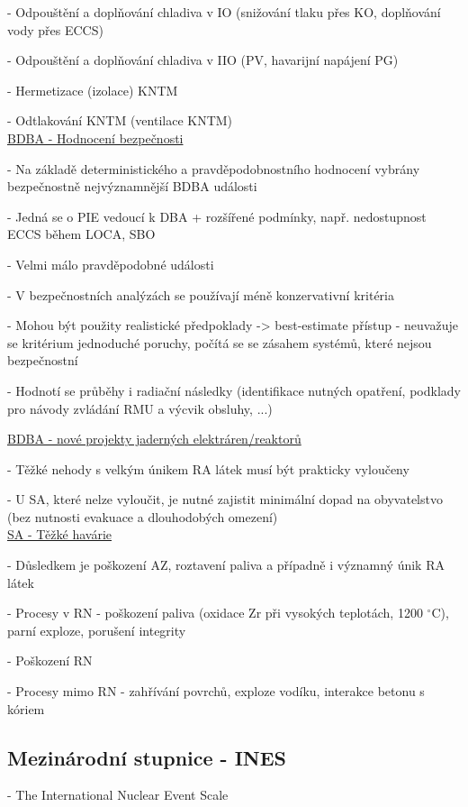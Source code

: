 \noindent - 	Odpouštění a doplňování chladiva v IO (snižování tlaku přes KO, doplňování vody přes ECCS)

\noindent - 	Odpouštění a doplňování chladiva v IIO (PV, havarijní napájení PG)

\noindent - 	Hermetizace (izolace) KNTM

\noindent - 	Odtlakování KNTM (ventilace KNTM)
\\

\underline{BDBA - Hodnocení bezpečnosti}

\noindent - 	Na základě deterministického a pravděpodobnostního hodnocení vybrány bezpečnostně nejvýznamnější BDBA události

\noindent - 	Jedná se o PIE vedoucí k DBA + rozšířené podmínky, např. nedostupnost ECCS během LOCA, SBO

\noindent - 	Velmi málo pravděpodobné události

\noindent - 	V bezpečnostních analýzách se používají méně konzervativní kritéria

\noindent - 	Mohou být použity realistické předpoklady -> best-estimate přístup - neuvažuje se kritérium jednoduché poruchy, počítá se se zásahem systémů, které nejsou bezpečnostní

\noindent - 	Hodnotí se průběhy i radiační následky (identifikace nutných opatření, podklady pro návody zvládání RMU a výcvik obsluhy, ...)

\vspace{6pt}
\underline{BDBA - nové projekty jaderných elektráren/reaktorů}

\noindent - 	Těžké nehody s velkým únikem RA látek musí být prakticky vyloučeny

\noindent - 	U SA, které nelze vyloučit, je nutné zajistit minimální dopad na obyvatelstvo (bez nutnosti evakuace a dlouhodobých omezení)
\\

\underline{SA - Těžké havárie}

\noindent - 	Důsledkem je poškození AZ, roztavení paliva a případně i významný únik RA látek

\noindent - 	Procesy v RN - poškození paliva (oxidace Zr při vysokých teplotách, 1200 $^\circ$C), parní exploze, porušení integrity

\noindent - 	Poškození RN

\noindent - 	Procesy mimo RN - zahřívání povrchů, exploze vodíku, interakce betonu s kóriem

\subsection{Mezinárodní stupnice - INES}
\noindent - 	The International Nuclear Event Scale

